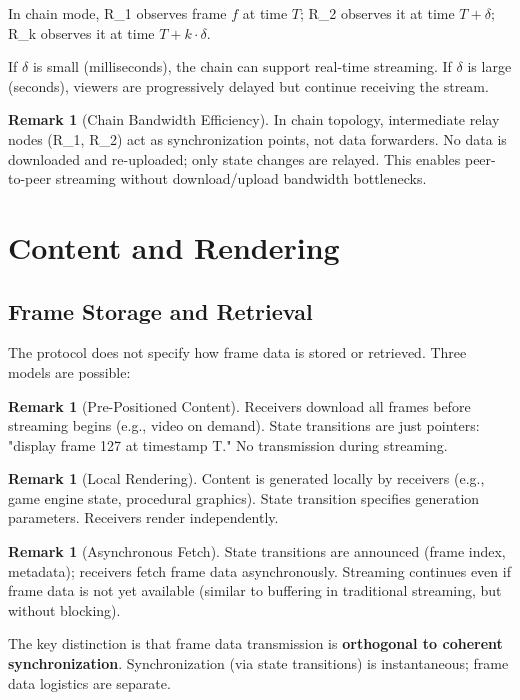 \documentclass[twocolumn,10pt,a4paper]{article}
\theoremstyle{plain}
\theoremstyle{definition}
\newtheorem{remark}[theorem]{Remark}
\begin{document}
In chain mode, R_1 observes frame $f$ at time $T$; R_2 observes it at time $T + \delta$; R_k observes it at time $T + k \cdot \delta$.

If $\delta$ is small (milliseconds), the chain can support real-time streaming. If $\delta$ is large (seconds), viewers are progressively delayed but continue receiving the stream.

\begin{remark}[Chain Bandwidth Efficiency]
In chain topology, intermediate relay nodes (R_1, R_2) act as synchronization points, not data forwarders. No data is downloaded and re-uploaded; only state changes are relayed. This enables peer-to-peer streaming without download/upload bandwidth bottlenecks.
\end{remark}

\section{Content and Rendering}
\label{sec:content}

\subsection{Frame Storage and Retrieval}

The protocol does not specify how frame data is stored or retrieved. Three models are possible:

\begin{remark}[Pre-Positioned Content]
Receivers download all frames before streaming begins (e.g., video on demand). State transitions are just pointers: "display frame 127 at timestamp T." No transmission during streaming.
\end{remark}

\begin{remark}[Local Rendering]
Content is generated locally by receivers (e.g., game engine state, procedural graphics). State transition specifies generation parameters. Receivers render independently.
\end{remark}

\begin{remark}[Asynchronous Fetch]
State transitions are announced (frame index, metadata); receivers fetch frame data asynchronously. Streaming continues even if frame data is not yet available (similar to buffering in traditional streaming, but without blocking).
\end{remark}

The key distinction is that frame data transmission is \textbf{orthogonal to coherent synchronization}. Synchronization (via state transitions) is instantaneous; frame data logistics are separate.
\end{document}
